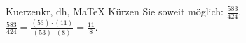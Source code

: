 \begin{MAufgabe}{Kuerzen}{kr, dh, MaTeX}
K\"urzen Sie soweit m\"oglich: $\frac{583}{424}$.\\ 
\ifLsg\MLoesung
\quad $\frac{583}{424}=\frac{(53)\cdot(11)}{(53)\cdot(8)}=\frac{11}{8}$.\else\relax\fi
 \end{MAufgabe}
